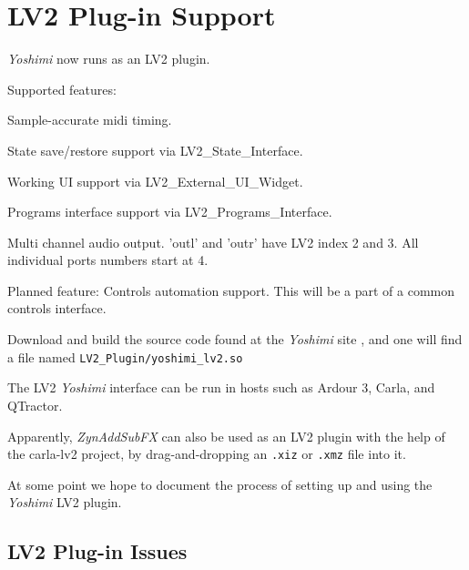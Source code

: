 %
%
%

\section{LV2 Plug-in Support}
\label{sec:lv2_plugin}

   \textsl{Yoshimi} now runs as an LV2 plugin.

Supported features:

   \begin{enumber}
      \item Sample-accurate midi timing.
      \item State save/restore support via LV2\_State\_Interface.
      \item Working UI support via LV2\_External\_UI\_Widget.
      \item Programs interface support via LV2\_Programs\_Interface.
      \item Multi channel audio output. 'outl' and 'outr' have LV2 index 2
         and 3. All individual ports numbers start at 4.
   \end{enumber}

   Planned feature: Controls automation support. This will be a part of a
   common controls interface.

   Download and build the source code found at the
   \textsl{Yoshimi} site \cite{yoshimi},
   and one will find a file named
   \texttt{LV2\_Plugin/yoshimi\_lv2.so}

   The LV2 \textsl{Yoshimi} interface can be run in hosts such as
   Ardour 3, Carla, and QTractor.

   Apparently, \textsl{ZynAddSubFX} can also be used as an LV2 plugin with
   the help of the carla-lv2 project, by drag-and-dropping an
   \texttt{.xiz} or \texttt{.xmz} file into it.

   At some point we hope to document the process of setting up and using
   the \textsl{Yoshimi} LV2 plugin.

\subsection{LV2 Plug-in Issues}
\label{subsec:lv2_plugin_issues}

